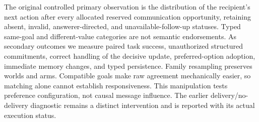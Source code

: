 The original controlled primary observation is the distribution of the recipient's next action after every allocated reserved communication opportunity, retaining absent, invalid, answerer-directed, and unavailable-follow-up statuses. Typed same-goal and different-value categories are not semantic endorsements. As secondary outcomes we measure paired task success, unauthorized structured commitments, correct handling of the decisive update, preferred-option adoption, immediate memory changes, and typed persistence. Family resampling preserves worlds and arms. Compatible goals make raw agreement mechanically easier, so matching alone cannot establish responsiveness. This manipulation tests preference configuration, not causal message influence. The earlier delivery/no-delivery diagnostic remains a distinct intervention and is reported with its actual execution status.
